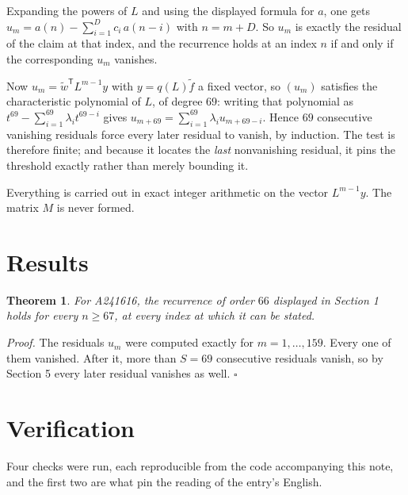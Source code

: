 \documentclass[11pt]{article}
\newtheorem{theorem}{Theorem}
\theoremstyle{definition}
\begin{document}
Expanding the powers of $L$ and using the displayed formula for $a$, one gets $u_m = a(n) - \sum_{i=1}^{D} c_i\,a(n-i)$ with $n = m + D$. So $u_m$ is exactly the residual of the claim at that index, and the recurrence holds at an index $n$ if and only if the corresponding $u_m$ vanishes.

Now $u_m = \tilde w^{\mathsf T} L^{m-1} y$ with $y = q(L)\tilde f$ a fixed vector, so $(u_m)$ satisfies the characteristic polynomial of $L$, of degree $69$: writing that polynomial as $t^{69} - \sum_{i=1}^{69} \lambda_i t^{69-i}$ gives $u_{m+69} = \sum_{i=1}^{69} \lambda_i u_{m+69-i}$. Hence $69$ consecutive vanishing residuals force every later residual to vanish, by induction. The test is therefore finite; and because it locates the {\itshape last} nonvanishing residual, it pins the threshold exactly rather than merely bounding it.

Everything is carried out in exact integer arithmetic on the vector $L^{m-1}y$. The matrix $M$ is never formed.

\section{Results}

\begin{theorem} For A241616, the recurrence of order $66$ displayed in Section 1 holds for every $n \ge 67$, at every index at which it can be stated.\end{theorem}

{\itshape Proof.} The residuals $u_m$ were computed exactly for $m = 1,\dots,159$. Every one of them vanished. After it, more than $S = 69$ consecutive residuals vanish, so by Section 5 every later residual vanishes as well. $\square$

\section{Verification}

Four checks were run, each reproducible from the code accompanying this note, and the first two are what pin the reading of the entry's English.
\end{document}
